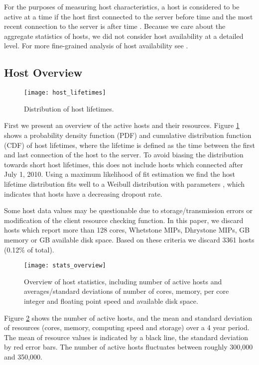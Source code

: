 \documentclass[conference]{IEEEtran}
\begin{document}
For the purposes of measuring host characteristics, a host is considered to be active at a time  if the host first connected to the server before time  and the most recent connection to the server is after time .  Because we care about the aggregate statistics of hosts, we did not consider host availability at a detailed level.  For more fine-grained analysis of host availability see \cite{Javadi:2009p7323,Nurmi:2005p333}.

\subsection{Host Overview}
\label{sec-host-overview}

\begin{figure}[!t]
\centering
\texttt{[image: host\_lifetimes]}
\caption{Distribution of host lifetimes.}
\label{fig-host-lifetime}
\end{figure}

First we present an overview of the active hosts and their resources.  Figure \ref{fig-host-lifetime} shows a probability density function (PDF) and cumulative distribution function (CDF) of host lifetimes, where the lifetime is defined as the time between the first and last connection of the host to the server.  To avoid biasing the distribution towards short host lifetimes, this does not include hosts which connected after July 1, 2010.  Using a maximum likelihood of fit estimation we find the host lifetime distribution fits well to a Weibull distribution with parameters , which indicates that hosts have a decreasing dropout rate.

Some host data values may be questionable due to storage/transmission errors or modification of the client resource checking function.  In this paper, we discard hosts which report more than 128 cores,  Whetstone MIPs,  Dhrystone MIPs,  GB memory or  GB available disk space.  Based on these criteria we discard 3361 hosts (0.12\% of total).

\begin{figure}[!t]
\centering
\texttt{[image: stats\_overview]}
\caption{Overview of host statistics, including number of active hosts and averages/standard deviations of number of cores, memory, per core integer and floating point speed and available disk space.}
\label{fig-res-overview}
\end{figure}

Figure \ref{fig-res-overview} shows the number of active hosts, and the mean and standard deviation of resources (cores, memory, computing speed and storage) over a 4 year period.  The mean of resource values is indicated by a black line, the standard deviation by red error bars.  The number of active hosts fluctuates between roughly 300,000 and 350,000.
\end{document}

